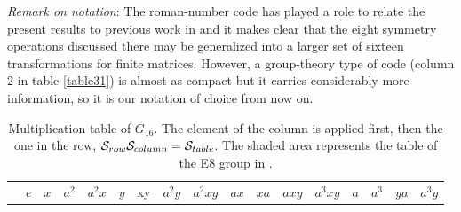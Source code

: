 {%





{\it Remark on notation}: The roman-number code has played a role to relate the present results to previous work in \cite{Ruschhaupt2017,Simon2018,Simon2019a} and it makes clear that  the eight symmetry operations discussed there may be generalized into a larger set of sixteen transformations
for finite matrices. However, a group-theory type of code (column 2 in  table \ref{table31}) is almost as compact but it carries considerably more information, so it is our notation of choice from now on.





\begin{landscape}
  \begin{table}[h]
    \caption{Multiplication table of $G_{16}$.
    The element of the  column is applied first, then  the one in the  row, ${\cal{S}}_{row}{\cal{S}}_{column}={\cal{S}}_{table}$. The shaded area represents the table of the E8 group
    in \cite{Simon2018}.
    \label{tablabe}}
    \vspace*{.2cm}
    \begin{tabular}{l|llllllllllllllll}
      \multicolumn{1}{l}{}&$e$
      & {$x$}
      & {$a^{2}$}
      & {$a^{2}x$}
      & {$y$}
      &{xy}
      & {$a^{2}y$}
      & {$a^{2}xy$}
      & {$ax$}
      &{$xa$}
      & {$axy$}
      &{$a^{3}xy$}
      & {$a$}
      & {$a^{3}$}
      & {$ya$}
      & {$a^{3}y$} \\


\end{tabular}
\end{table}
\end{landscape}}
